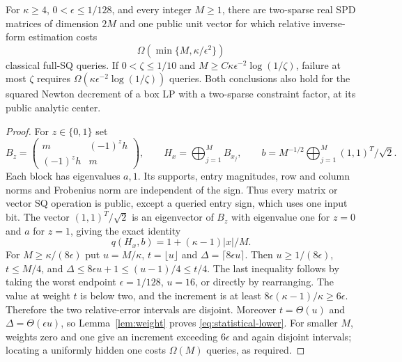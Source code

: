 \begin{theorem}\label{thm:statistical-lower}
For $\kappa\geq4$, $0<\epsilon\leq1/128$, and every integer $M\geq1$,
there are two-sparse real SPD matrices of dimension $2M$ and one public
unit vector for which relative inverse-form estimation costs
\begin{equation}\label{eq:statistical-lower}
 \Omega(\min\{M,\kappa/\epsilon^2\})
\end{equation}
classical full-SQ queries. If $0<\zeta\leq1/10$ and
$M\geq C\kappa\epsilon^{-2}\log(1/\zeta)$, failure at most $\zeta$
requires $\Omega(\kappa\epsilon^{-2}\log(1/\zeta))$ queries.
Both conclusions also hold for the squared Newton decrement of a box LP
with a two-sparse constraint factor, at its public analytic center.
\end{theorem}
\begin{proof}
For $z\in\{0,1\}$ set
\[
 B_z=\begin{pmatrix}m&(-1)^zh\\(-1)^zh&m\end{pmatrix},
 \qquad H_x=\bigoplus_{j=1}^M B_{x_j},\qquad
 b=M^{-1/2}\bigoplus_{j=1}^M(1,1)^T/\sqrt2.
\]
Each block has eigenvalues $a,1$. Its supports, entry magnitudes, row
and column norms and Frobenius norm are independent of the sign.
Thus every matrix or vector SQ operation is public, except a queried
entry sign, which uses one input bit. The vector $(1,1)^T/\sqrt2$ is an
eigenvector of $B_z$ with eigenvalue one for $z=0$ and $a$ for $z=1$,
giving the exact identity
\begin{equation}\label{eq:sign-block-form}
 q(H_x,b)=1+(\kappa-1)|x|/M.
\end{equation}
For $M\geq\kappa/(8\epsilon)$ put $u=M/\kappa$,
$t=\lfloor u\rfloor$ and $\Delta=\lceil8\epsilon u\rceil$.
Then $u\geq1/(8\epsilon)$, $t\leq M/4$, and
$\Delta\leq8\epsilon u+1\leq(u-1)/4\leq t/4$.
The last inequality follows by taking the worst endpoint
$\epsilon=1/128$, $u=16$, or directly by rearranging.
The value at weight $t$ is below two, and the increment is at least
$8\epsilon(\kappa-1)/\kappa\geq6\epsilon$.
Therefore the two relative-error intervals are disjoint.
Moreover $t=\Theta(u)$ and $\Delta=\Theta(\epsilon u)$, so
Lemma~\ref{lem:weight} proves \eqref{eq:statistical-lower}.
For smaller $M$, weights zero and one give an increment exceeding
$6\epsilon$ and again disjoint intervals; locating a uniformly hidden
one costs $\Omega(M)$ queries, as required.


\end{proof}
